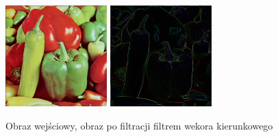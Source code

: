 \documentclass[final,a4paper,openany,12pt]{mwbk}
\begin{document}
\begin{figure}[H]
	\begin{center}
		\includegraphics[width=0.35\textwidth]{peppers_color}
		\includegraphics[width=0.35\textwidth]{peppers_color_vdgPrewitt_result}
	\end{center}
	\caption{Obraz wejściowy, obraz po filtracji filtrem wekora kierunkowego}
\end{figure}


\end{document}
